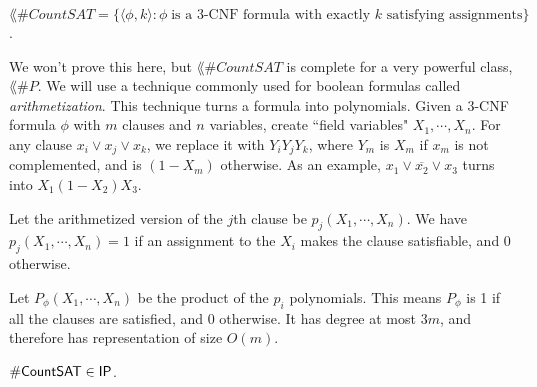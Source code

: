 \newcommand{\CountSAT}{\lang{\#CountSAT}}
\begin{definition}
$\CountSAT = \{\langle \phi, k \rangle \colon \phi\;\text{is a 3-CNF formula with exactly $k$ satisfying assignments}\}$.
\end{definition}
We won't prove this here, but $\CountSAT$ is complete for a very powerful class, $\lang{\#P}$. We will use a technique commonly used for boolean formulas called \emph{arithmetization}. This technique turns a formula into polynomials. Given a 3-CNF formula $\phi$ with $m$ clauses and $n$ variables, create ``field variables" $X_1, \cdots, X_n$. For any clause $x_i \vee x_j \vee x_k$, we replace it with $Y_iY_jY_k$, where $Y_m$ is $X_m$ if $x_m$ is not complemented, and is $(1-X_m)$ otherwise. As an example, $x_1 \vee \overline{x_2} \vee x_3$ turns into $X_1(1-X_2)X_3$. 

\par Let the arithmetized version of the $j$th clause be $p_j(X_1, \cdots, X_n)$. We have $p_j(X_1, \cdots, X_n) = 1$ if an assignment to the $X_i$ makes the clause satisfiable, and 0 otherwise. 

\par Let $P_{\phi}(X_1, \cdots, X_n)$ be the product of the $p_i$ polynomials. This means $P_{\phi}$ is 1 if all the clauses are satisfied, and 0 otherwise. It has degree at most $3m$, and therefore has representation of size $O(m)$. 

\begin{theorem}
$\CountSAT \in \IP$.
\end{theorem}

